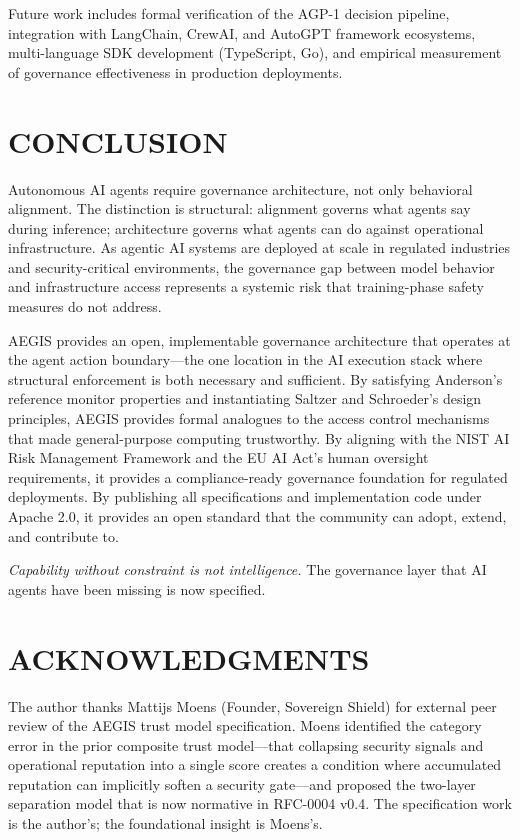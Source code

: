 \documentclass{IEEEcsmag}
\begin{document}
Future work includes formal verification of the AGP-1 decision pipeline, integration with LangChain, CrewAI, and AutoGPT framework ecosystems, multi-language SDK development (TypeScript, Go), and empirical measurement of governance effectiveness in production deployments.

\section{CONCLUSION}

Autonomous AI agents require governance architecture, not only behavioral alignment. The distinction is structural: alignment governs what agents say during inference; architecture governs what agents can do against operational infrastructure. As agentic AI systems are deployed at scale in regulated industries and security-critical environments, the governance gap between model behavior and infrastructure access represents a systemic risk that training-phase safety measures do not address.

AEGIS provides an open, implementable governance architecture that operates at the agent action boundary---the one location in the AI execution stack where structural enforcement is both necessary and sufficient. By satisfying Anderson's reference monitor properties and instantiating Saltzer and Schroeder's design principles, AEGIS provides formal analogues to the access control mechanisms that made general-purpose computing trustworthy. By aligning with the NIST AI Risk Management Framework and the EU AI Act's human oversight requirements, it provides a compliance-ready governance foundation for regulated deployments. By publishing all specifications and implementation code under Apache 2.0, it provides an open standard that the community can adopt, extend, and contribute to.

{\it Capability without constraint is not intelligence.} The governance layer that AI agents have been missing is now specified.

\section{ACKNOWLEDGMENTS}

The author thanks Mattijs Moens (Founder, Sovereign Shield) for external peer review of the AEGIS trust model specification. Moens identified the category error in the prior composite trust model---that collapsing security signals and operational reputation into a single score creates a condition where accumulated reputation can implicitly soften a security gate---and proposed the two-layer separation model that is now normative in RFC-0004 v0.4. The specification work is the author's; the foundational insight is Moens's.
\end{document}
